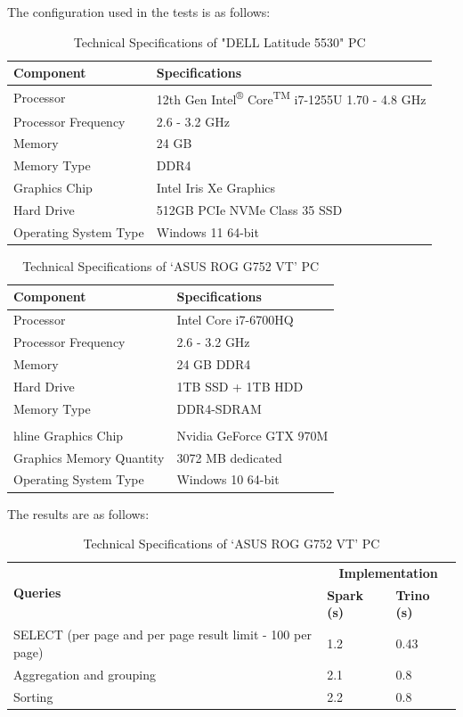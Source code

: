 The configuration used in the tests is as follows:
\begin{table}[h]
\centering
\label{tab:caracteristiques}
\begin{tabular}{|l|l|}
\hline
\textbf{Component} & \textbf{Specifications} \\ \hline
Processor & 12th Gen Intel\textsuperscript{®} Core\textsuperscript{TM} i7-1255U 1.70 - 4.8 GHz \\ \hline
Processor Frequency & 2.6 - 3.2 GHz \\ \hline
Memory & 24 GB \\ \hline
Memory Type & DDR4 \\ \hline
Graphics Chip & Intel Iris Xe Graphics \\ \hline
Hard Drive & 512GB PCIe NVMe Class 35 SSD \\ \hline
Operating System Type & Windows 11 64-bit \\ \hline
\end{tabular}
\caption{Technical Specifications of "DELL Latitude 5530" PC}
\end{table}

\begin{table}[h]
\centering
\label{tab:caracteristiques-2}
\begin{tabular}{|l|l|}
\hline
\textbf{Component} & \textbf{Specifications} \\ \hline
Processor & Intel Core i7-6700HQ \\ \hline
Processor Frequency & 2.6 - 3.2 GHz \\ \hline
Memory & 24 GB DDR4 \\ \hline
Hard Drive & 1TB SSD + 1TB HDD \\ \hline
Memory Type & DDR4-SDRAM \\ \\hline
Graphics Chip & Nvidia GeForce GTX 970M \\ \hline
Graphics Memory Quantity & 3072 MB dedicated \\ \hline
Operating System Type & Windows 10 64-bit \\ \hline
\end{tabular}
\caption{Technical Specifications of `ASUS ROG G752 VT' PC}
\end{table}

The results are as follows:

\begin{table}[h]
\centering
\label{tab:resultats}
\begin{tabular}{|l|l|l|}
\hline
\multirow{2}{*}{\textbf{Queries}} & \multicolumn{2}{c|}{\textbf{Implementation}} \\ \cline{2-3}
& \textbf{Spark (s)} & \textbf{Trino (s)} \\ \hline
SELECT (per page and per page result limit - 100 per page) & 1.2 & 0.43 \\ \hline
Aggregation and grouping & 2.1 & 0.8 \\ \hline
Sorting & 2.2 & 0.8 \\ \hline
\end{tabular}
\caption{Technical Specifications of `ASUS ROG G752 VT' PC}
\end{table}

